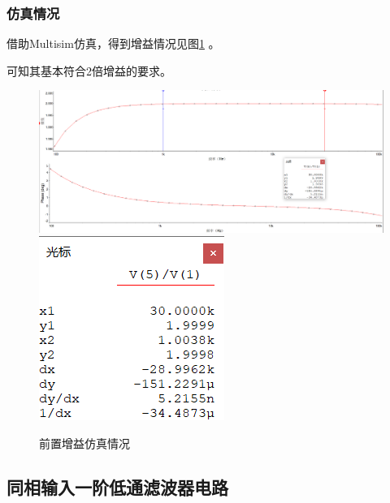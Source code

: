 \documentclass[12pt]{article}
\begin{document}
\subsubsection{仿真情况}
借助Multisim仿真，得到增益情况见图\ref{qzzyfzt1}
。\par 可知其基本符合2倍增益的要求。
\begin{figure}[htbp]
  \centering
  \includegraphics[width=\textwidth]{picture/TIM20190505124555}\\
  \includegraphics[width=.3\textwidth]{picture/TIM20190505124809}
  \caption{前置增益仿真情况}\label{qzzyfzt1}
\end{figure}
\subsection{同相输入一阶低通滤波器电路}
\end{document}
